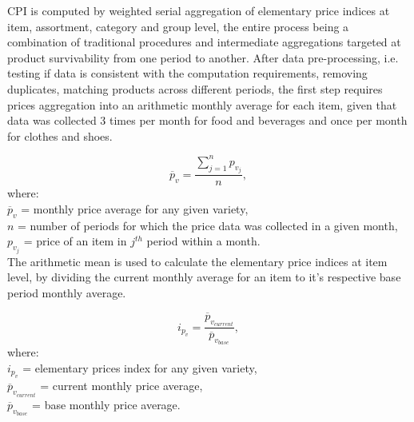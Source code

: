 \documentclass[]{article}
\begin{document}
CPI is computed by weighted serial aggregation of elementary price indices at item, assortment, 
category and group level, the entire process being a combination of traditional procedures 
and intermediate aggregations targeted at product survivability from one period to another. After data pre-processing, 
i.e. testing if data is consistent with the computation requirements, removing duplicates, matching 
products across different periods, the first step requires prices aggregation into an arithmetic 
monthly average for each item, given that data was collected 3 times per month for food and 
beverages and once per month for clothes and shoes. 

\begin{equation}\label{eq:1}
\overline{p}_{v} = \frac{\sum_{j=1}^n {p_{v_{j}}}}{n} ,
\end{equation}
where:\\
$\overline{p}_{v}$ = monthly price average for any given variety, \\
$n$ = number of periods for which the price data was collected in a given month, \\
$p_{v_{j}}$ = price of an item in $j^{th}$ period within a month.\\	


The arithmetic mean is used to calculate the elementary 
price indices at item level, by dividing the current monthly average for an item to it's respective base period monthly average. 

\begin{equation}\label{eq:2}
i_{p_{v}} = \frac{\overline{p}_{v_{current}}}{\overline{p}_{v_{base}}} ,
\end{equation}
where:\\
$i_{p_{v}}$ = elementary prices index for any given variety, \\
$\overline{p}_{v_{current}}$ = current monthly price average, \\
$\overline{p}_{v_{base}}$ = base monthly price average.\\
\end{document}
